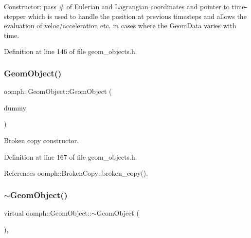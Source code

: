 Constructor\+: pass \# of Eulerian and Lagrangian coordinates and pointer to time-\/stepper which is used to handle the position at previous timesteps and allows the evaluation of veloc/acceleration etc. in cases where the Geom\+Data varies with time. 



Definition at line 146 of file geom\+\_\+objects.\+h.

\mbox{\label{classoomph_1_1GeomObject_a4692862c406fe6dfa04c21b4a4f09892}} 
\subsubsection{\texorpdfstring{Geom\+Object()}{GeomObject()}\hspace{0.1cm}{\footnotesize\ttfamily [5/5]}}
{\footnotesize\ttfamily oomph\+::\+Geom\+Object\+::\+Geom\+Object (\begin{DoxyParamCaption}\item[{const \hyperlink{classoomph_1_1GeomObject}{Geom\+Object} \&}]{dummy }\end{DoxyParamCaption})\hspace{0.3cm}{\ttfamily [inline]}}



Broken copy constructor. 



Definition at line 167 of file geom\+\_\+objects.\+h.



References oomph\+::\+Broken\+Copy\+::broken\+\_\+copy().

\mbox{\label{classoomph_1_1GeomObject_ab784d34d63bd852ee30fc03684717410}} 
\subsubsection{\texorpdfstring{$\sim$\+Geom\+Object()}{~GeomObject()}}
{\footnotesize\ttfamily virtual oomph\+::\+Geom\+Object\+::$\sim$\+Geom\+Object (\begin{DoxyParamCaption}{ }\end{DoxyParamCaption})\hspace{0.3cm}{\ttfamily [inline]}, {\ttfamily [virtual]}}



